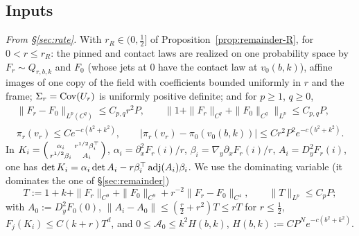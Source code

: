 \subsection{Inputs}\label{ssec:third-inputs}

\emph{From \S\ref{sec:rate}.} With $r_R\in(0,\frac12]$ of Proposition~\ref{prop:remainder-R}, for $0<r\le r_R$: the pinned and contact laws are realized on one probability space by $F_r\sim Q_{r,b,k}$ and $F_0$ (whose jets at $0$ have the contact law at $v_0(b,k)$), affine images of one copy of the field with coefficients bounded uniformly in $r$ and the frame; $\Sigma_r=\operatorname{Cov}(U_r)$ is uniformly positive definite; and for $p\ge1$, $q\ge0$,
\begin{gather}
\|F_r-F_0\|_{L^p(C^q)}\le C_{p,q}r^2P,\qquad \bigl\|1+\|F_r\|_{C^q}+\|F_0\|_{C^q}\bigr\|_{L^p}\le C_{p,q}P,\label{eq:third-coupling}\\
\pi_r(v_r)\le Ce^{-c(b^2+k^2)},\qquad |\pi_r(v_r)-\pi_0(v_0(b,k))|\le Cr^2P^2e^{-c(b^2+k^2)}.\label{eq:third-pindens}
\end{gather}
In $K_i=\begin{psmallmatrix}\alpha_i&r^{1/2}\beta_i^\top\\ r^{1/2}\beta_i&A_i\end{psmallmatrix}$, $\alpha_i=\partial_x^2F_r(i)/r$, $\beta_i=\nabla_y\partial_xF_r(i)/r$, $A_i=D_y^2F_r(i)$, one has $\det K_i=\alpha_i\det A_i-r\beta_i^\top\operatorname{adj}(A_i)\beta_i$. We use the dominating variable (it dominates the one of \S\ref{sec:remainder})
\begin{equation}\label{eq:third-T}
T:=1+k+\|F_r\|_{C^9}+\|F_0\|_{C^9}+r^{-2}\|F_r-F_0\|_{C^4},\qquad \|T\|_{L^p}\le C_pP;
\end{equation}
with $A_0:=D_y^2F_0(0)$, $\|A_i-A_0\|\le(\frac r2+r^2)T\le rT$ for $r\le\frac12$, $F_j(K_i)\le C(k+r)T^d$, and $0\le \mathcal A_0\le k^2H(b,k)$, $H(b,k):=CP^Ne^{-c(b^2+k^2)}$.


